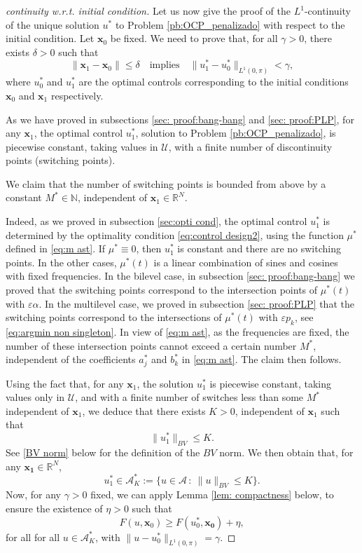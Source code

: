 \documentclass[twocolumn]{autart}    %
\begin{document}
\begin{proof}[continuity w.r.t. initial condition]
Let us now give the proof of the $L^1$-continuity of the unique solution $u^\ast$ to Problem \ref{pb:OCP_penalizado} with respect to the initial condition.
Let $\bm{x}_0$ be fixed.
We need to prove that, for all $\gamma >0$, there exists $\delta >0$ such that 
$$\| \bm{x}_1-\bm{x}_0\| \leq \delta
\quad \text{implies} \quad
\| u^\ast_1 - u^\ast_0\|_{L^1(0,\pi)} <\gamma,$$
where $u^\ast_0$ and $u^\ast_1$ are the optimal controls corresponding to the initial conditions $\bm{x}_0$ and $\bm{x}_1$ respectively. 


As we have proved in subsections \ref{sec: proof:bang-bang} and \ref{sec: proof:PLP}, for any $\bm{x}_1$, the optimal control $u_1^\ast$, solution to Problem \ref{pb:OCP_penalizado}, is piecewise constant, taking values in $\mathcal{U}$, with a finite number of discontinuity points (switching points).

We claim that the number of switching points is bounded from above by a constant $M^\ast \in \mathbb{N}$, independent of  $\bm{x}_1\in \mathbb{R}^N$. 

Indeed, as we proved in subsection \ref{sec:opti cond}, the optimal control $u_1^\ast$ is determined by the optimality condition \eqref{eq:control design2}, using the function $\mu^\ast$ defined in \eqref{eq:m ast}. 
If $\mu^\ast \equiv 0$, then $u^\ast_1$ is constant and there are no switching points.
In the other cases, $\mu^\ast(t)$ is a linear combination of sines and cosines with fixed frequencies.  In the bilevel case, in subsection \ref{sec: proof:bang-bang} we proved that the switching points correspond to the intersection points of $\mu^\ast(t)$ with $\varepsilon\alpha$. In the multilevel case, we proved in subsection \ref{sec: proof:PLP} that the switching points correspond to the intersections of $\mu^\ast(t)$ with $\varepsilon p_k$, see \eqref{eq:argmin non singleton}.  
In view of \eqref{eq:m ast}, as the frequencies are fixed, the number of these intersection points cannot exceed a certain number $M^\ast$, independent of the coefficients $a_j^\ast$ and $b_k^\ast$ in \eqref{eq:m ast}. The claim then follows.

Using the fact that, for any $\bm{x}_1$, the solution $u_1^\ast$ is piecewise constant, taking values only in $\mathcal{U}$, and with a finite number of switches less than some $M^\ast$ independent of $\bm{x}_1$,  we deduce that there exists $K>0$, independent of $\bm{x}_1$ such that
$$
\| u_1^\ast\|_{BV} \leq K.
$$
See \eqref{BV norm} below for the definition of the $BV$ norm.
We then obtain that, for any $\bm{x_1}\in \mathbb{R}^N$,
$$u_1^\ast\in \mathcal{A}_K^\ast:= \{ u\in \mathcal{A}\, : \ \| u\|_{BV} \leq K \}.$$
Now, for any $\gamma>0$ fixed, we can apply Lemma \ref{lem: compactness} below, to ensure the existence of $\eta>0$ such that
\begin{equation}\label{eq:low est boundary}
 F(u, \bm{x}_0)  \geq F(u_0^\ast, \bm{x_0})  + \eta,
\end{equation}
for all for all $u\in \mathcal{A}_K^\ast$, with $\| u-u_0^\ast\|_{L^1(0,\pi)} =\gamma$.


\end{proof}
\end{document}
